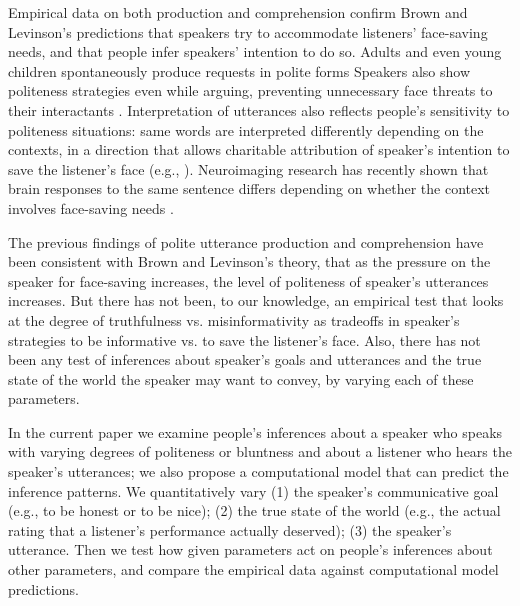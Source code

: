 \documentclass[10pt,letterpaper]{article}
\begin{document}
Empirical data on both production and comprehension confirm Brown and Levinson's predictions that speakers try to accommodate listeners' face-saving needs, and that people infer speakers' intention to do so. Adults and even young children spontaneously produce requests in polite forms \cite{clark1980, axia1985} Speakers also show politeness strategies even while arguing, preventing unnecessary face threats to their interactants \cite{holtgraves1997}. Interpretation of utterances also reflects people's sensitivity to politeness situations: same words are interpreted differently depending on the contexts, in a direction that allows charitable attribution of speaker's intention to save the listener's face (e.g., \cite{bonnefon2009}). Neuroimaging research has recently shown that brain responses to the same sentence differs depending on whether the context involves face-saving needs \cite{bavsnakova2014}.

The previous findings of polite utterance production and comprehension have been consistent with Brown and Levinson's theory, that as the pressure on the speaker for face-saving increases, the level of politeness of speaker's utterances increases. But there has not been, to our knowledge, an empirical test that looks at the degree of truthfulness vs. misinformativity as tradeoffs in speaker's strategies to be informative vs. to save the listener's face. Also, there has not been any test of inferences about speaker's goals and utterances and the true state of the world the speaker may want to convey, by varying each of these parameters. 

In the current paper we examine people's inferences about a speaker who speaks with varying degrees of politeness or bluntness and about a listener who hears the speaker's utterances; we also propose a computational model that can predict the inference patterns. We quantitatively vary (1) the speaker's communicative goal (e.g., to be honest or to be nice); (2) the true state of the world (e.g., the actual rating that a listener's performance actually deserved); (3) the speaker's utterance. Then we test how given parameters act on people's inferences about other parameters, and compare the empirical data against computational model predictions.

\end{document}
